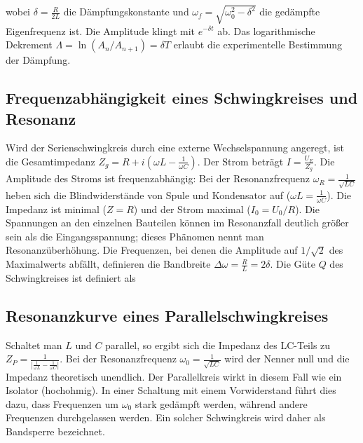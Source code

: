 wobei $\delta = \frac{R}{2L}$ die Dämpfungskonstante und $\omega_f = \sqrt{\omega_0^2 - \delta^2}$ die gedämpfte Eigenfrequenz ist. Die Amplitude klingt mit $e^{-\delta t}$ ab. Das logarithmische Dekrement $\Lambda = \ln(A_n/A_{n+1}) = \delta T$ erlaubt die experimentelle Bestimmung der Dämpfung.

\subsection{Frequenzabhängigkeit eines Schwingkreises und Resonanz}
\label{ssec:final_cite}
Wird der Serienschwingkreis durch eine externe Wechselspannung angeregt, ist die Gesamtimpedanz $Z_g = R + i(\omega L - \frac{1}{\omega C})$. Der Strom beträgt $I = \frac{U_E}{Z_g}$. Die Amplitude des Stroms ist frequenzabhängig:
Bei der Resonanzfrequenz $\omega_R = \frac{1}{\sqrt{LC}}$ heben sich die Blindwiderstände von Spule und Kondensator auf ($\omega L = \frac{1}{\omega C}$). Die Impedanz ist minimal ($Z=R$) und der Strom maximal ($I_0 = U_0/R$). Die Spannungen an den einzelnen Bauteilen können im Resonanzfall deutlich größer sein als die Eingangsspannung; dieses Phänomen nennt man Resonanzüberhöhung. Die Frequenzen, bei denen die Amplitude auf $1/\sqrt{2}$ des Maximalwerts abfällt, definieren die Bandbreite $\Delta \omega = \frac{R}{L} = 2\delta$. Die Güte $Q$ des Schwingkreises ist definiert als

\subsection{Resonanzkurve eines Parallelschwingkreises}
Schaltet man $L$ und $C$ parallel, so ergibt sich die Impedanz des LC-Teils zu $Z_P = \frac{1}{| \frac{1}{\omega L} - \frac{1}{\omega C} |}$. Bei der Resonanzfrequenz $\omega_0 = \frac{1}{\sqrt{LC}}$ wird der Nenner null und die Impedanz theoretisch unendlich. Der Parallelkreis wirkt in diesem Fall wie ein Isolator (hochohmig). In einer Schaltung mit einem Vorwiderstand führt dies dazu, dass Frequenzen um $\omega_0$ stark gedämpft werden, während andere Frequenzen durchgelassen werden. Ein solcher Schwingkreis wird daher als Bandsperre bezeichnet.

